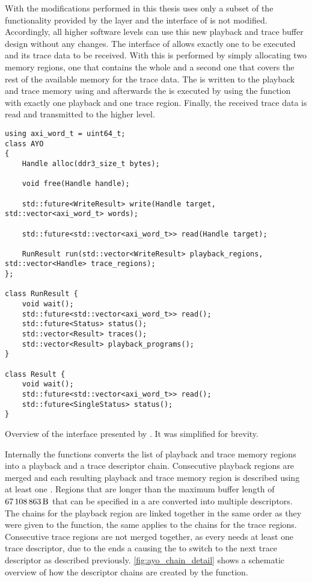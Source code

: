 With the modifications performed in this thesis \hxcomm{} uses only a subset of the functionality provided by the \ayo{} layer and the interface of \hxcomm{} is not modified. Accordingly, all higher software levels can use this new playback and trace buffer design without any changes.
The interface of \hxcomm{} allows exactly one \PlaybackProgram{} to be executed and its trace data to be received. With \ayo{} this is performed by simply allocating two memory regions, one that contains the whole \PlaybackProgram{} and a second one that covers the rest of the available memory for the trace data. The \PlaybackProgram{} is written to the playback and trace memory using  and afterwards the \PlaybackProgram{} is executed by using the  function with exactly one playback and one trace region. Finally, the received trace data is read and transmitted to the higher level.

\begin{listing}
\begin{verbatim}
using axi_word_t = uint64_t;
class AYO
{
	Handle alloc(ddr3_size_t bytes);

	void free(Handle handle);

	std::future<WriteResult> write(Handle target, std::vector<axi_word_t> words);

	std::future<std::vector<axi_word_t>> read(Handle target);

	RunResult run(std::vector<WriteResult> playback_regions, std::vector<Handle> trace_regions);
};

class RunResult {
	void wait();
	std::future<std::vector<axi_word_t>> read();
	std::future<Status> status();
	std::vector<Result> traces();
	std::vector<Result> playback_programs();
}

class Result {
	void wait();
	std::future<std::vector<axi_word_t>> read();
	std::future<SingleStatus> status();
}
\end{verbatim}
\caption{Overview of the interface presented by \ayo{}. It was simplified for brevity.}\label{listing:ayo_interface}
\end{listing}

Internally the  functions converts the list of playback and trace memory regions into a playback and a trace descriptor chain. Consecutive playback regions are merged and each resulting playback and trace memory region is described using at least one \descriptor{}. Regions that are longer than the maximum buffer length of $\SI{67108863}{\byte}$ that can be specified in a \descriptor{} are converted into multiple descriptors. The \descriptor{} chains for the playback region are linked together in the same order as they were given to the  function, the same applies to the \descriptor{} chains for the trace regions. Consecutive trace regions are not merged together, as every \PlaybackProgram{} needs at least one trace descriptor, due to the \haltInstr{} ends a \PlaybackProgram{} causing the \AXIDMA{} to switch to the next trace descriptor as described previously.
\autoref{fig:ayo_chain_detail} shows a schematic overview of how the descriptor chains are created by the  function.

